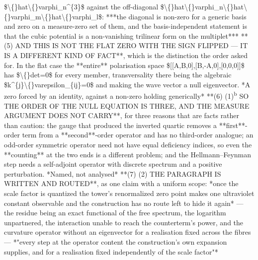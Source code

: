 \begin{description}
\$\textbackslash\{\}hat\textbackslash\{\}varphi\_n\textasciicircum{}\{3\}\$ against the off-diagonal \$\textbackslash\{\}hat\textbackslash\{\}varphi\_n\textbackslash\{\}hat\textbackslash\{\}varphi\_m\textbackslash\{\}hat\textbackslash\{\}varphi\_l\$: ***the diagonal is non-zero for a generic basis and zero on a measure-zero set of them, and the basis-independent statement is that the cubic potential is a non-vanishing trilinear form on the multiplet***  **(5)  AND THIS IS NOT THE FLAT ZERO WITH THE SIGN FLIPPED --- IT IS A DIFFERENT KIND OF FACT**, which is the distinction the order asked for. In the flat case the **entire** polarisation space \$[[A,B,0],[B,-A,0],[0,0,0]]\$ has \$\textbackslash\{\}det=0\$ for every member, transversality there being the algebraic \$k\textasciicircum{}\{j\}\textbackslash\{\}varepsilon\_\{ij\}=0\$ and making the wave vector a null eigenvector. *A zero forced by an identity, against a non-zero holding generically*  **(6) (1)\textsuperscript{b} SO THE ORDER OF THE NULL EQUATION IS THREE, AND THE MEASURE ARGUMENT DOES NOT CARRY**, for three reasons that are facts rather than caution: the gauge that produced the inverted quartic removes a **first**-order term from a **second**-order operator and has no third-order analogue; an odd-order symmetric operator need not have equal deficiency indices, so even the **counting** at the two ends is a different problem; and the Hellmann--Feynman step needs a self-adjoint operator with discrete spectrum and a positive perturbation. *Named, not analysed*  **(7) (2) THE PARAGRAPH IS WRITTEN AND ROUTED**, as one claim with a uniform scope: *once the scale factor is quantized the tower's renormalized zero point makes one ultraviolet constant observable and the construction has no route left to hide it again* --- the residue being an exact functional of the free spectrum, the logarithm unpartnered, the interaction unable to reach the counterterm's power, and the curvature operator without an eigenvector for a realisation fixed across the fibres --- *"every step at the operator content the construction's own expansion supplies, and for a realisation fixed independently of the scale factor"*

\end{description}
